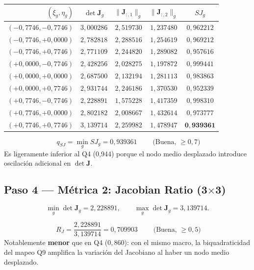 \documentclass[11pt,a4paper]{article}
\begin{document}
\begin{center}
\renewcommand{\arraystretch}{1.15}
\begin{tabular}{rccc|c}
\toprule
$(\xi_g,\eta_g)$ & $\det\mathbf{J}_g$ & $\|\mathbf{J}_{:,1}\|_g$ & $\|\mathbf{J}_{:,2}\|_g$ & $SJ_g$ \\
\midrule
$(-0{,}7746,-0{,}7746)$ & $3{,}000286$ & $2{,}519730$ & $1{,}237480$ & $0{,}962212$ \\
$(-0{,}7746,+0{,}0000)$ & $2{,}782818$ & $2{,}288516$ & $1{,}254619$ & $0{,}969212$ \\
$(-0{,}7746,+0{,}7746)$ & $2{,}771109$ & $2{,}244820$ & $1{,}289082$ & $0{,}957616$ \\
$(+0{,}0000,-0{,}7746)$ & $2{,}428256$ & $2{,}028275$ & $1{,}197872$ & $0{,}999441$ \\
$(+0{,}0000,+0{,}0000)$ & $2{,}687500$ & $2{,}132194$ & $1{,}281113$ & $0{,}983863$ \\
$(+0{,}0000,+0{,}7746)$ & $2{,}931744$ & $2{,}246186$ & $1{,}370530$ & $0{,}952339$ \\
$(+0{,}7746,-0{,}7746)$ & $2{,}228891$ & $1{,}575228$ & $1{,}417359$ & $0{,}998310$ \\
$(+0{,}7746,+0{,}0000)$ & $2{,}802182$ & $2{,}008667$ & $1{,}432614$ & $0{,}973777$ \\
$(+0{,}7746,+0{,}7746)$ & $3{,}139714$ & $2{,}259982$ & $1{,}478947$ & $\mathbf{0{,}939361}$ \\
\bottomrule
\end{tabular}
\end{center}

\begin{resultbox}[title={M\'etrica 1: Scaled Jacobian Q9}]
\[
\boxed{\;q_{SJ} = \min_g SJ_g = 0{,}939361\;}\qquad \text{(Buena, $\ge 0{,}7$)}
\]
Es ligeramente inferior al Q4 (0{,}944) porque el nodo medio desplazado introduce oscilaci\'on adicional en $\det\mathbf{J}$.
\end{resultbox}

\subsection{Paso 4 --- M\'etrica 2: Jacobian Ratio (3$\times$3)}
\[
\min_g \det\mathbf{J}_g = 2{,}228891,\qquad \max_g \det\mathbf{J}_g = 3{,}139714.
\]

\begin{resultbox}[title={M\'etrica 2: Jacobian Ratio Q9}]
\[
\boxed{\;R_J = \frac{2{,}228891}{3{,}139714} = 0{,}709903\;} \qquad \text{(Buena, $\ge 0{,}5$)}
\]
Notablemente \textbf{menor} que en Q4 ($0{,}860$): con el mismo macro, la biquadraticidad del mapeo Q9 amplifica la variaci\'on del Jacobiano al haber un nodo medio desplazado.
\end{resultbox}
\end{document}

